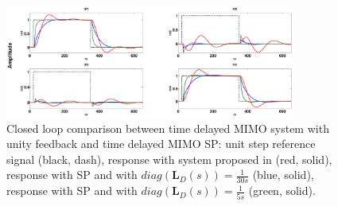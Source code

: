 \documentclass[A4, 10pt, conference]{ieeeconf}
\begin{document}
\begin{figure}
\centering
{}
\hspace*{-0.3cm}\includegraphics[width=0.85\textwidth]{pics/comp_ld_2.eps}
\caption{Closed loop comparison between time delayed MIMO system with unity feedback and time delayed MIMO SP: unit step reference signal (black, dash), response with system proposed in \cite{GKL10b} (red, solid), response with SP and with $diag \left(\mathbf{L}_D(s)\right)=\frac{1}{30s}$ (blue, solid), response with SP and with $diag \left(\mathbf{L}_D(s)\right)=\frac{1}{5s}$ (green, solid).}
\label{fig:comp}
\end{figure}
\end{document}

